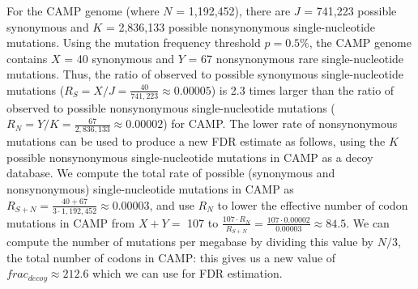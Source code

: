 For the CAMP genome
(where $N$ = 1,192,452),
there are $J$ = 741,223 possible synonymous and
$K$ = 2,836,133 possible nonsynonymous single-nucleotide mutations.
%
Using the mutation frequency threshold $p = 0.5\%$,
the CAMP genome contains
$X$ = 40 synonymous and
$Y$ = 67 nonsynonymous rare single-nucleotide mutations.
%
Thus, the ratio of observed to possible synonymous single-nucleotide mutations
($R_S = X / J = \frac{40}{741,223}
\approx 0.00005$)
is 2.3 times larger than the ratio of observed to possible nonsynonymous single-nucleotide mutations
($R_N = Y / K = \frac{67}{2,836,133}
\approx 0.00002$)
for CAMP.
%
The lower rate of nonsynonymous mutations can be used to produce a new FDR estimate
as follows, using the $K$ possible nonsynonymous single-nucleotide mutations
in CAMP as a decoy database.
%
We compute the total rate of possible (synonymous and nonsynonymous) single-nucleotide mutations
in CAMP as $R_{S + N} =
\frac{40 + 67}{3 \cdot 1,192,452}
\approx 0.00003$, and use $R_N$ to lower the effective number of
codon mutations in CAMP from $X + Y =$ 107 to
$\frac{107 \cdot R_N}{R_{S + N}} =
\frac{107 \cdot 0.00002}{0.00003} \approx 84.5$.
%
We can compute the number of mutations per megabase by dividing this value by $N / 3$,
the total number of codons in CAMP: this gives us a new value of
$frac_{decoy} \approx 212.6$ which we can use for FDR estimation.
\endinput